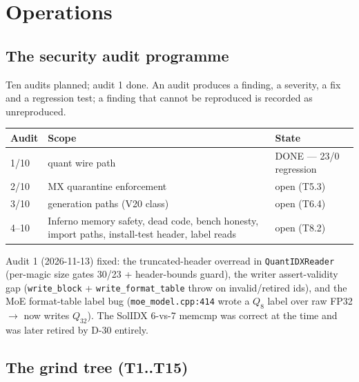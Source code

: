 \chapter{Operations}

\section{The security audit programme}

Ten audits planned; audit 1 done. An audit produces a finding, a severity, a fix and a
regression test; a finding that cannot be reproduced is recorded as unreproduced.

\begin{tabular}{@{}lll@{}}
\toprule
Audit & Scope & State\\
\midrule
1/10 & quant wire path & DONE --- 23/0 regression\\
2/10 & MX quarantine enforcement & open (T5.3)\\
3/10 & generation paths (V20 class) & open (T6.4)\\
4--10 & Inferno memory safety, dead code, bench honesty, import paths, install-test header, label reads & open (T8.2)\\
\bottomrule
\end{tabular}

\medskip
Audit 1 (2026-11-13) fixed: the truncated-header overread in \texttt{QuantIDXReader}
(per-magic size gates 30/23 + header-bounds guard), the writer assert-validity gap
(\texttt{write\_block} + \texttt{write\_format\_table} throw on invalid/retired ids), and the
MoE format-table label bug (\texttt{moe\_model.cpp:414} wrote a $Q_8$ label over raw FP32
$\to$ now writes $Q_{32}$). The SolIDX 6-vs-7 memcmp was correct at the time and was later
retired by D-30 entirely.

\section{The grind tree (T1..T15)}


